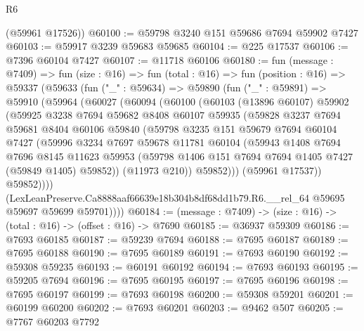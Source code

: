 \begin{lexlean}{R6}
\begin{coremodule}
      (@59961 @17526))
@60100 := @59798 @3240 @151 @59686 @7694 @59902 @7427
@60103 := @59917 @3239 @59683 @59685
@60104 := @225 @17537
@60106 := @7396 @60104 @7427
@60107 := @11718 @60106
@60180 := fun (message : @7409) =>
  fun (size : @16) =>
  fun (total : @16) =>
  fun (position : @16) =>
  @59337
    (@59633
      (fun ("_" : @59634) =>
      @59890
        (fun ("_" : @59891) =>
        @59910
          (@59964
            (@60027
              (@60094
                (@60100
                  (@60103
                    (@13896 @60107)
                    @59902
                    (@59925
                      @3238
                      @7694
                      @59682
                      @8408
                      @60107
                      @59935
                      (@59828
                        @3237
                        @7694
                        @59681
                        @8404
                        @60106
                        @59840
                        (@59798
                          @3235
                          @151
                          @59679
                          @7694
                          @60104
                          @7427
                          (@59996
                            @3234
                            @7697
                            @59678
                            @11781
                            @60104
                            (@59943
                              @1408
                              @7694
                              @7696
                              @8145
                              @11623
                              @59953
                              (@59798 @1406 @151 @7694 @7694 @1405 @7427 (@59849 @1405) @59852))
                            (@11973 @210))
                          @59852)))
                    (@59961 @17537))
                  @59852))))
          (LexLeanPreserve.Ca8888aaf66639e18b304b8df68dd1b79.R6.__rel_64
            @59695
            @59697
            @59699
            @59701))))
@60184 := (message : @7409) -> (size : @16) -> (total : @16) -> (offset : @16) -> @7690
@60185 := @36937 @59309
@60186 := @7693 @60185
@60187 := @59239 @7694
@60188 := @7695 @60187
@60189 := @7695 @60188
@60190 := @7695 @60189
@60191 := @7693 @60190
@60192 := @59308 @59235
@60193 := @60191 @60192
@60194 := @7693 @60193
@60195 := @59205 @7694
@60196 := @7695 @60195
@60197 := @7695 @60196
@60198 := @7695 @60197
@60199 := @7693 @60198
@60200 := @59308 @59201
@60201 := @60199 @60200
@60202 := @7693 @60201
@60203 := @9462 @507
@60205 := @7767 @60203 @7792

\end{coremodule}
\end{lexlean}
